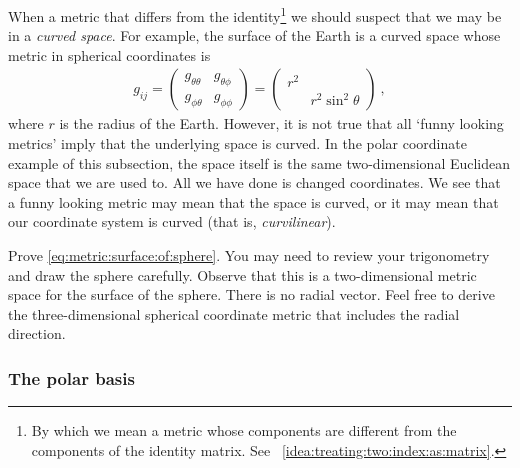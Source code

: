 \documentclass[12pt]{article}
\begin{document}
When a metric that differs from the identity\footnote{By which we mean a metric whose components are different from the components of the identity matrix. See \bigidearef~\ref{idea:treating:two:index:as:matrix}.} we should suspect that we may be in a \emph{curved space}. For example, the surface of the Earth is a curved space whose metric in spherical coordinates is
\begin{align}
    g_{ij} = 
    \begin{pmatrix}
        g_{\theta\theta} & g_{\theta\phi}\\
        g_{\phi\theta} & g_{\phi\phi}
    \end{pmatrix}
    =
    \begin{pmatrix}
        r^2 & \\
        & r^2 \sin^2\theta
    \end{pmatrix} \ ,
    \label{eq:metric:surface:of:sphere}
\end{align}
where $r$ is the radius of the Earth. However, it is not true that all `funny looking metrics' imply that the underlying space is curved. In the polar coordinate example of this subsection, the space itself is the same two-dimensional Euclidean space that we are used to. All we have done is changed coordinates. We see that a funny looking metric may mean that the space is curved, or it may mean that our coordinate system is curved (that is, \emph{curvilinear}). 

\begin{exercise}
Prove \eqref{eq:metric:surface:of:sphere}. You may need to review your trigonometry and draw the sphere carefully. Observe that this is a two-dimensional metric space for the surface of the sphere. There is no radial vector. Feel free to derive the three-dimensional spherical coordinate metric that includes the radial direction. 
\end{exercise}

\subsubsection{The polar basis}
\end{document}

